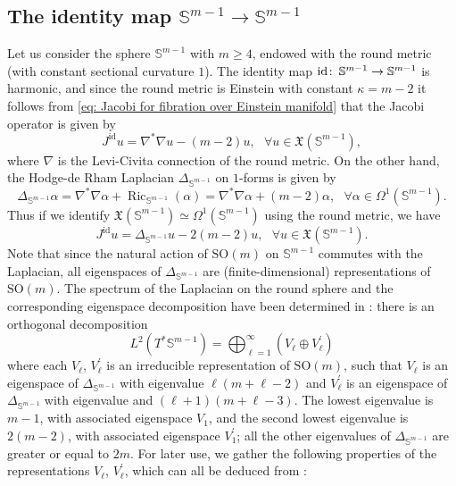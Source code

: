\documentclass{article}
\numberwithin{equation}{section}        %
\theoremstyle{bfnote}
\theoremstyle{definition}
\theoremstyle{bfremark}
\newcommand{\col}{\colon \thinspace}        %
\newcommand{\Sp}{\mathbb{S}}                %
\DeclareMathOperator{\Ric}{Ric}                 %
\DeclareMathOperator{\id}{id}                   %
\begin{document}
    \subsection{The identity map $\mathbb{S}^{m-1} \to \mathbb{S}^{m-1}$}      \label{subsec: The identity map}

Let us consider the sphere $\mathbb{S}^{m-1}$ with $m \geq 4$, endowed with the round metric (with constant sectional curvature $1$). The identity map $\id \col \mathbb{S}^{m-1} \to \Sp^{m-1}$ is harmonic, and since the round metric is Einstein with constant $\kappa =m-2$ it follows from \eqref{eq: Jacobi for fibration over Einstein manifold} that the Jacobi operator is given by
\begin{equation*}
    J^{\id} u = \nabla^*\nabla u - (m-2) u, ~~~ \forall u \in \mathfrak{X}(\mathbb{S}^{m-1}),
\end{equation*}
where $\nabla$ is the Levi-Civita connection of the round metric. On the other hand, the Hodge-de Rham Laplacian $\Delta_{\mathbb{S}^{m-1}}$ on $1$-forms is given by
\begin{equation*}
    \Delta_{\mathbb{S}^{m-1}} \alpha = \nabla^*\nabla \alpha + \Ric_{\mathbb{S}^{m-1}}(\alpha) = \nabla^*\nabla \alpha + (m-2) \alpha ,  ~~~ \forall \alpha \in \Omega^1(\mathbb{S}^{m-1}). 
\end{equation*}
Thus if we identify $\mathfrak{X}(\mathbb{S}^{m-1}) \simeq \Omega^1(\mathbb{S}^{m-1})$ using the round metric, we have
\begin{equation*}
    J^{\id} u = \Delta_{\mathbb{S}^{m-1}} u - 2(m-2) u, ~~~ \forall u \in \mathfrak{X}(\mathbb{S}^{m-1}) .
\end{equation*}
Note that since the natural action of $\mathrm{SO}(m)$ on $\Sp^{m-1}$ commutes with the Laplacian, all eigenspaces of $\Delta_{\Sp^{m-1}}$ are (finite-dimensional) representations of $\mathrm{SO}(m)$. The spectrum of the Laplacian on the round sphere and the corresponding eigenspace decomposition have been determined in \cite[Th. C]{folland1989harmonic}: there is an orthogonal decomposition
\begin{equation}        \label{eq: Eigenspace decomposition of the Laplacian on spheres}
    L^2(T^*\mathbb{S}^{m-1}) = \bigoplus_{\ell=1}^\infty (V_\ell \oplus V^\prime_\ell)
\end{equation}
where each $V_\ell$, $V^\prime_\ell$ is an irreducible representation of $\mathrm{SO}(m)$, such that $V_\ell$ is an eigenspace of $\Delta_{\mathbb{S}^{m-1}}$ with eigenvalue $\ell(m+\ell-2)$ and $V^\prime_\ell$ is an eigenspace of $\Delta_{\mathbb{S}^{m-1}}$ with eigenvalue  and $(\ell+1)(m+\ell-3)$. The lowest eigenvalue is $m-1$, with associated eigenspace $V_1$, and the second lowest eigenvalue is $2(m-2)$, with associated eigenspace $V^\prime_1$; all the other eigenvalues of $\Delta_{\mathbb{S}^{m-1}}$ are greater or equal to $2m$. For later use, we gather the following properties of the representations $V_\ell$, $V^\prime_\ell$, which can all be deduced from \cite{folland1989harmonic}:
\end{document}
